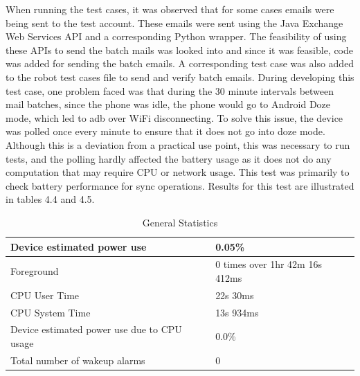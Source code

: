 When running the test cases, it was observed that for some cases emails were being sent to the test account. These emails were sent using the Java Exchange Web Services API and a corresponding Python wrapper. The feasibility of using these APIs to send the batch mails was looked into and since it was feasible, code was added for sending the batch emails. A corresponding test case was also added to the robot test cases file to send and verify batch emails. During developing this test case, one problem faced was that during the 30 minute intervals between mail batches, since the phone was idle, the phone would go to Android Doze mode, which led to adb over WiFi disconnecting. To solve this issue, the device was polled once every minute to ensure that it does not go into doze mode. Although this is a deviation from a practical use point, this was necessary to run tests, and the polling hardly affected the battery usage as it does not do any computation that may require CPU or network usage. This test was primarily to check battery performance for sync operations. Results for this test are illustrated in tables 4.4 and 4.5.\\

\begin{table}[!h]
\begin{center}
\caption{General Statistics}
\begin{tabular}{|P{8cm}|P{6.5cm}|}
\hline
Device estimated power use                  & 0.05\%                      \\ \hline
Foreground                                  & 0 times over 1hr 42m 16s 412ms \\ \hline
CPU User Time                               & 22s 30ms                 \\ \hline
CPU System Time                             & 13s 934ms                \\ \hline
Device estimated power use due to CPU usage & 0.0\%                       \\ \hline
Total number of wakeup alarms               & 0     \\    \hline                
\end{tabular}
\end{center}
\end{table}

